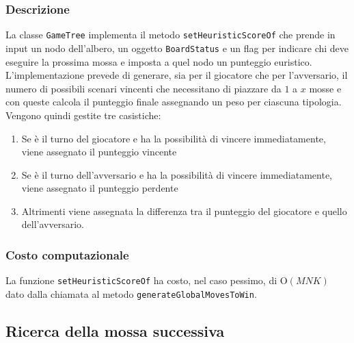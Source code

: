 \documentclass[11pt]{article}
\begin{document}
\subsubsection*{Descrizione}
La classe \texttt{GameTree} implementa il metodo \texttt{setHeuristicScoreOf} che prende in input un nodo dell'albero, un oggetto \texttt{BoardStatus} e un flag per indicare chi deve eseguire la prossima mossa e imposta a quel nodo un punteggio euristico.\\
L'implementazione prevede di generare, sia per il giocatore che per l'avversario, il numero di possibili scenari vincenti che necessitano di piazzare da $1$ a $x$ mosse e con queste calcola il punteggio finale assegnando un peso per ciascuna tipologia.\\
Vengono quindi gestite tre casistiche: 
\begin{enumerate}
\setlength\itemsep{0.05cm}
	\item Se è il turno del giocatore e ha la possibilità di vincere immediatamente, viene assegnato il punteggio vincente
	\item Se è il turno dell'avversario e ha la possibilità di vincere immediatamente, viene assegnato il punteggio perdente
	\item Altrimenti viene assegnata la differenza tra il punteggio del giocatore e quello dell'avversario.
\end{enumerate}
\subsubsection*{Costo computazionale}
La funzione \texttt{setHeuristicScoreOf} ha costo, nel caso pessimo, di O$(MNK)$ dato dalla chiamata al metodo \texttt{generateGlobalMovesToWin}.

\newpage

\subsection*{Ricerca della mossa successiva}
\end{document}
